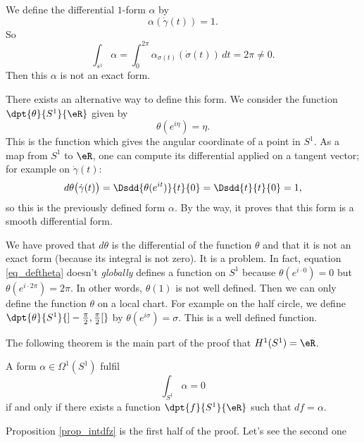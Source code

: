 We define the differential $1$-form $\alpha$ by
\[ 
  \alpha(\dot\gamma(t))=1.
\]
So
\[ 
  \int_{s^1}\alpha=\int_0^{2\pi}\alpha_{\sigma(t)}(\dot \sigma(t))\,dt=2\pi\neq0.
\]
Then this $\alpha$ is not an exact form.

There exists an alternative way to define this form. We consider the function $\dpt{ \theta }{ S^1 }{ \eR }$ given by 
\begin{equation} \label{eq_deftheta}
\theta(e^{i\eta})=\eta.
\end{equation}
 This is the function which gives the angular coordinate of a point in $S^1$. As a map from $S^1$ to $\eR$, one can compute its differential applied on a tangent vector; for example on $\dot\gamma(t)$:
\[ 
  d\theta\big( \dot\gamma(t) \big)=\Dsdd{ \theta(e^{it}) }{t}{0}=\Dsdd{ t }{t}{0}=1,
\]
so this is the previously defined form $\alpha$. By the way, it proves that this form is a smooth differential form.

We have proved that $d\theta$ is the differential of the function $\theta$ and that it is not an exact form (because its integral is not zero). It is a problem. In fact, equation \eqref{eq_deftheta} doesn't \emph{globally} defines a function on $S^1$ because $\theta(e^{i\cdot 0})=0$ but $\theta(e^{i\cdot 2\pi})=2\pi$. In other words, $\theta(1)$ is not well defined. Then we can only define the function $\theta$ on a local chart. For example on the half circle, we define $\dpt{ \theta }{ S^1 }{ ]-\frac{ \pi }{ 2 },\frac{ \pi }{2}[ }$ by $\theta(e^{i\sigma})=\sigma$. This is a well defined function.

The following theorem is the main part of the proof that $H^1(S^1)=\eR$.

\begin{theorem}
   A form $\alpha\in\Omega^1(S^1)$ fulfil
\[ 
  \int_{S^1}\alpha=0
\]
if and only if there exists a function $\dpt{ f }{ S^1 }{ \eR }$ such that $df=\alpha$.
\end{theorem}
Proposition  \ref{prop_intdfz} is the first half of the proof. Let's see the second one

